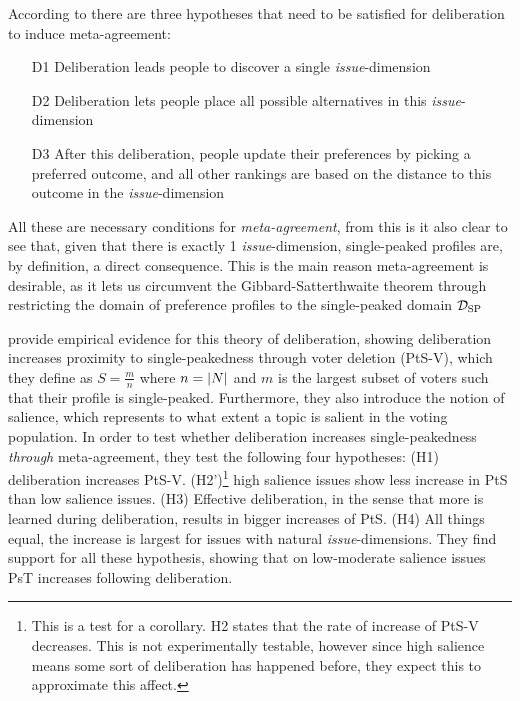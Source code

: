 According to \citet{listTwoConceptsAgreement2002} there are three hypotheses that need to be satisfied for deliberation to induce meta-agreement:
\begin{enumerate}
	\label{list:meta-agreement-checklist}
	\setlength\itemsep{1px}
	\item [D1] Deliberation leads people to discover a single \emph{issue}-dimension
	\item [D2] Deliberation lets people place all possible alternatives in this \emph{issue}-dimension
	\item [D3] After this deliberation, people update their preferences by picking
	      a preferred outcome, and all other rankings are based on the distance to this outcome in the \emph{issue}-dimension
\end{enumerate}

All these are necessary conditions for \emph{meta-agreement}, from this is it
also clear to see that, given that there is exactly 1 \emph{issue}-dimension,
single-peaked profiles are, by definition, a direct consequence. This is the
main reason meta-agreement is desirable, as it lets us circumvent the
Gibbard-Satterthwaite theorem \citep{gibbardManipulationVotingSchemes1973,
	satterthwaiteStrategyproofnessArrowsConditions1975} through restricting the
domain of preference profiles to the single-peaked domain $\mathcal{D}_{\textnormal{SP}}$


\citet{listDeliberationSinglePeakednessPossibility2013} provide empirical
evidence for this theory of deliberation, showing deliberation increases
proximity to single-peakedness through voter deletion (PtS-V), which they define as $S= \frac{m}{n}$
where $n = |N|$ and $m$ is the largest subset of voters such that their
profile is single-peaked. Furthermore, they also introduce the notion of
salience, which represents to what extent a topic is salient in the voting
population. In order to test whether deliberation increases single-peakedness
\emph{through} meta-agreement, they test the following four hypotheses: (H1)
deliberation increases PtS-V. (H2')\footnote{This is a
	test for a corollary. H2 states that the rate of increase of PtS-V decreases. This is not experimentally testable, however since
	high salience means some sort of deliberation has happened before, they expect
	this to approximate this affect.} high salience issues show less increase in
PtS than low salience issues. (H3) Effective deliberation, in the sense that
more is learned during deliberation, results in bigger increases of PtS. (H4)
All things equal, the increase is largest for issues with natural
\emph{issue}-dimensions. They find support for all these hypothesis, showing
that on low-moderate salience issues PsT increases following deliberation.

